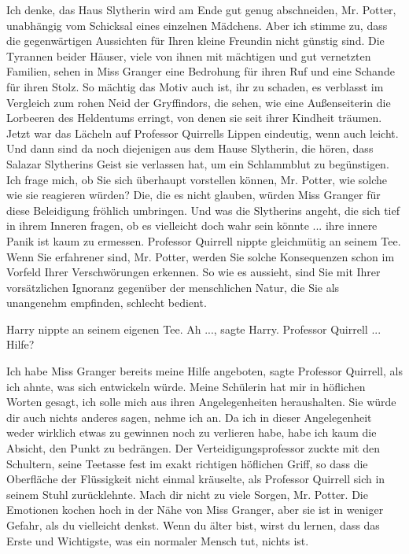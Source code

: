 \glqq{}Ich denke, das Haus Slytherin wird am Ende gut genug abschneiden, Mr.
Potter, unabhängig vom Schicksal eines einzelnen Mädchens. Aber ich stimme zu,
dass die gegenwärtigen Aussichten für Ihren kleine Freundin nicht günstig sind.
Die Tyrannen beider Häuser, viele von ihnen mit mächtigen und gut vernetzten
Familien, sehen in Miss Granger eine Bedrohung für ihren Ruf und eine Schande
für ihren Stolz. So mächtig das Motiv auch ist, ihr zu schaden, es verblasst im
Vergleich zum rohen Neid der Gryffindors, die sehen, wie eine Außenseiterin die
Lorbeeren des Heldentums erringt, von denen sie seit ihrer Kindheit
träumen.\grqq{} Jetzt war das Lächeln auf Professor Quirrells Lippen eindeutig,
wenn auch leicht. \glqq{}Und dann sind da noch diejenigen aus dem Hause
Slytherin, die hören, dass Salazar Slytherins Geist sie verlassen hat, um ein
Schlammblut zu begünstigen. Ich frage mich, ob Sie sich überhaupt vorstellen
können, Mr. Potter, wie solche wie sie reagieren würden? Die, die es nicht
glauben, würden Miss Granger für diese Beleidigung fröhlich umbringen. Und was
die Slytherins angeht, die sich tief in ihrem Inneren fragen, ob es vielleicht
doch wahr sein könnte ... ihre innere Panik ist kaum zu ermessen.\grqq{}
Professor Quirrell nippte gleichmütig an seinem Tee. \glqq{}Wenn Sie erfahrener
sind, Mr. Potter, werden Sie solche Konsequenzen schon im Vorfeld Ihrer
Verschwörungen erkennen. So wie es aussieht, sind Sie mit Ihrer vorsätzlichen
Ignoranz gegenüber der menschlichen Natur, die Sie als unangenehm empfinden,
schlecht bedient.\grqq{}

Harry nippte an seinem eigenen Tee. \glqq{}Ah ...\grqq{}, sagte Harry. \glqq{}
Professor Quirrell ... Hilfe?\grqq{}

\glqq{}Ich habe Miss Granger bereits meine Hilfe angeboten\grqq{}, sagte
Professor Quirrell, \glqq{}als ich ahnte, was sich entwickeln würde. Meine
Schülerin hat mir in höflichen Worten gesagt, ich solle mich aus ihren
Angelegenheiten heraushalten. Sie würde dir auch nichts anderes sagen, nehme ich
an. Da ich in dieser Angelegenheit weder wirklich etwas zu gewinnen noch zu
verlieren habe, habe ich kaum die Absicht, den Punkt zu bedrängen.\grqq{} Der
Verteidigungsprofessor zuckte mit den Schultern, seine Teetasse fest im exakt
richtigen höflichen Griff, so dass die Oberfläche der Flüssigkeit nicht einmal
kräuselte, als Professor Quirrell sich in seinem Stuhl zurücklehnte. \glqq{}Mach
dir nicht zu viele Sorgen, Mr. Potter. Die Emotionen kochen hoch in der Nähe von
Miss Granger, aber sie ist in weniger Gefahr, als du vielleicht denkst. Wenn du
älter bist, wirst du lernen, dass das Erste und Wichtigste, was ein normaler
Mensch tut, nichts ist.\grqq{}

